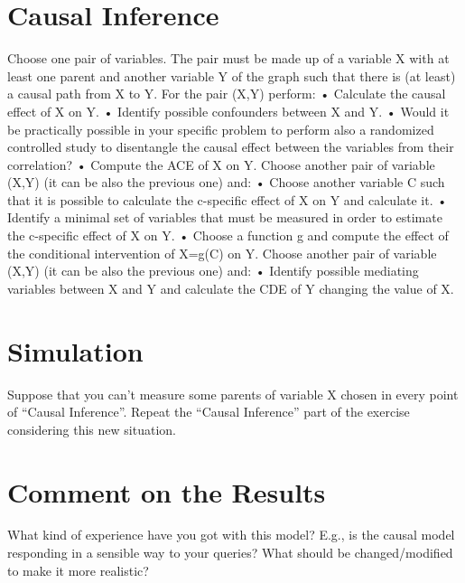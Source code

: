 \documentclass[a4paper,12pt]{article} %
\begin{document}
\section{Causal Inference}

Choose one pair of variables. The pair must be made up of a variable X with at least one parent and another variable Y of the graph such that there is (at least) a causal path from X to Y.
For the pair (X,Y) perform:
• Calculate the causal effect of X on Y.
• Identify possible confounders between X and Y.
• Would it be practically possible in your specific problem to perform also a randomized controlled study to disentangle the causal effect between the variables from their correlation?
• Compute the ACE of X on Y.
Choose another pair of variable (X,Y) (it can be also the previous one) and:
• Choose another variable C such that it is possible to calculate the c-specific effect of X on Y and calculate it.
• Identify a minimal set of variables that must be measured in order to estimate the c-specific effect of X on Y.
• Choose a function g and compute the effect of the conditional intervention of X=g(C) on Y.
Choose another pair of variable (X,Y) (it can be also the previous one) and:
• Identify possible mediating variables between X and Y and calculate the CDE of Y changing the value of X.

\section{Simulation}
Suppose that you can’t measure some parents of variable X chosen in every point of “Causal Inference”.
Repeat the “Causal Inference” part of the exercise considering this new situation.

\section{Comment on the Results}
What kind of experience have you got with this model? E.g., is the causal model responding in a sensible way to your queries? What should be changed/modified to make it more realistic?
\end{document}
